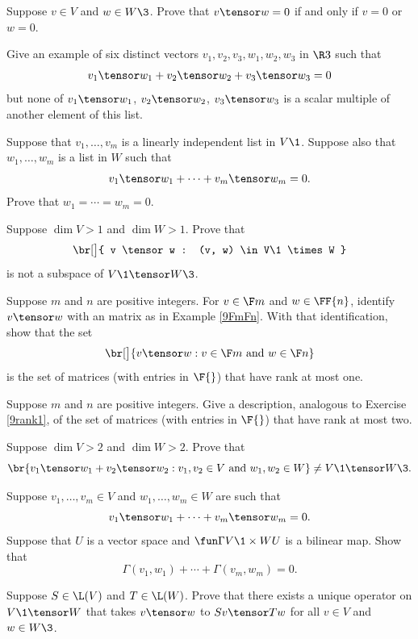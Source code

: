 
\exercise
Suppose $v \in V$ and $w \in W\3$. Prove that $v \tensor w = 0$ if and only if $v = 0$ or $w = 0$.\label{9zeroten}


\exercise
Give an example of six distinct vectors $v_1, v_2, v_3, w_1, w_2, w_3$ in $\R3$ such that
\[
v_1 \tensor w_1 + v_2 \tensor w_2 + v_3 \tensor w_3 = 0
\]
but none of $v_1 \tensor w_1$, $v_2 \tensor w_2$, $v_3 \tensor w_3$ is a scalar multiple of another element of this list.


\exercise
Suppose that $v_1, \ldots, v_m$ is a linearly independent list in $V\1$. Suppose also that $w_1, \ldots, w_m$ is a list in $W$ such that
\[
v_1 \tensor w_1 + \cdots + v_m \tensor w_m = 0.
\]
Prove that $w_1 = \cdots = w_m = 0$.


\exercise
Suppose $\dim V > 1$ and $\dim W > 1$. Prove that\label{9VtenW}
\[
\br[\big]{ v \tensor w : (v, w) \in V\1 \times W }
\]
is not a subspace of $V\1 \tensor W\3$.
\vspace{-10bp}


\exercise
Suppose $m$ and $n$ are positive integers. For $v \in \F m$ and $w \in \FF{n}$, identify $v \tensor w$ with an  matrix as in Example \ref{9FmFn}. With that identification, show that the set\label{9rank1}
\[
\br[\big]{ v \tensor w : v \in \F m \text{ and } w \in \F n }
\]
is the set of  matrices (with entries in $\F{}$) that have rank at most one.


\exercise
Suppose $m$ and $n$ are positive integers. Give a description, analogous to Exercise \ref{9rank1}, of the set of  matrices (with entries in $\F{}$) that have rank at most two.\label{9rank2}


\exercise
Suppose $\dim V > 2$ and $\dim W > 2$. Prove that
\[
\br{ v_1 \tensor w_1 + v_2 \tensor w_2 : v_1, v_2 \in V \text{ and } w_1, w_2 \in W } \ne V\1 \tensor W\3.
\]
\exercisedisplayend


\exercise
Suppose $v_1, \ldots, v_m \in V$ and $w_1, \ldots,w_m \in W$ are such that
\[
v_1 \tensor w_1 + \cdots + v_m \tensor w_m = 0.
\]
Suppose that $U$ is a vector space and $\fun \Gamma {V\1 \times W} U$ is a bilinear map.
Show that
\[
\Gamma(v_1, w_1) + \cdots + \Gamma(v_m, w_m) = 0.
\]
\exercisedisplayend


\exercise
Suppose $S \in \L(V)$ and $T \in \L(W)$. Prove that there exists a unique operator on $V\1 \tensor W$ that takes
$v \tensor w$ to $Sv \tensor Tw$ for all $v \in V$ and $w \in W\3$.
\label{9LVtenLW}


